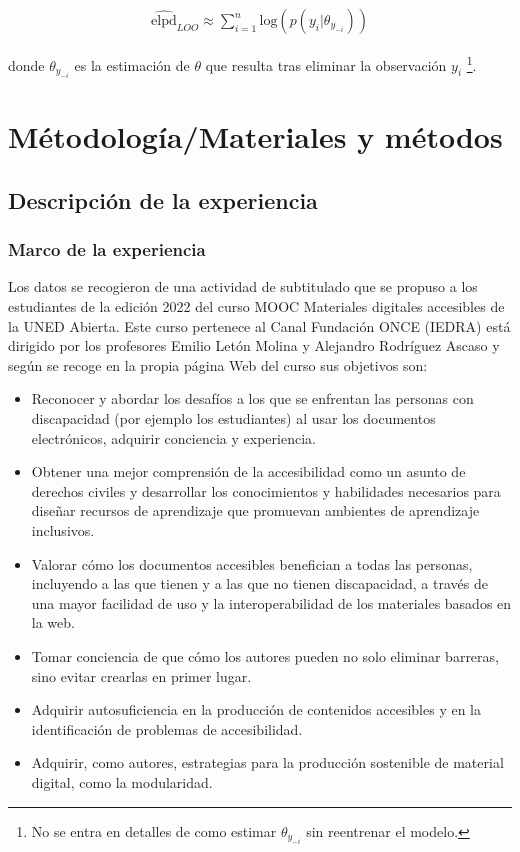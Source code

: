 \documentclass[
  12pt,
  a4paper,
  extrafontsizes,
  onecolumn,
  openright,
  table]{memoir}
\begin{document}
\[
\begin{aligned}
\widehat{\mathrm{elpd}}_{LOO} \approx \sum_{i=1}^{n} \mathrm{log} (p(y_{i} | \theta_{y_{-i}}))
\end{aligned}
\]

donde \(\theta_{y_{-i}}\) es la estimación de \(\theta\) que resulta
tras eliminar la observación \(y_{i}\) \footnote{No se entra en detalles
  de como estimar \(\theta_{y_{-i}}\) sin reentrenar el modelo.}.


\hypertarget{sec-metodo}{%
\chapter{Métodología/Materiales y métodos}\label{sec-metodo}}

\hypertarget{descripciuxf3n-de-la-experiencia}{%
\section{Descripción de la
experiencia}\label{descripciuxf3n-de-la-experiencia}}

\hypertarget{marco-de-la-experiencia}{%
\subsection{Marco de la experiencia}\label{marco-de-la-experiencia}}

Los datos se recogieron de una actividad de subtitulado que se propuso a
los estudiantes de la edición 2022 del curso MOOC Materiales digitales
accesibles de la UNED Abierta. Este curso pertenece al Canal Fundación
ONCE (IEDRA) está dirigido por los profesores Emilio Letón Molina y
Alejandro Rodríguez Ascaso y según se recoge en la propia página Web del
curso sus objetivos son:

\begin{itemize}
\item
  Reconocer y abordar los desafíos a los que se enfrentan las personas
  con discapacidad (por ejemplo los estudiantes) al usar los documentos
  electrónicos, adquirir conciencia y experiencia.
\item
  Obtener una mejor comprensión de la accesibilidad como un asunto de
  derechos civiles y desarrollar los conocimientos y habilidades
  necesarios para diseñar recursos de aprendizaje que promuevan
  ambientes de aprendizaje inclusivos.
\item
  Valorar cómo los documentos accesibles benefician a todas las
  personas, incluyendo a las que tienen y a las que no tienen
  discapacidad, a través de una mayor facilidad de uso y la
  interoperabilidad de los materiales basados en la web.
\item
  Tomar conciencia de que cómo los autores pueden no solo eliminar
  barreras, sino evitar crearlas en primer lugar.
\item
  Adquirir autosuficiencia en la producción de contenidos accesibles y
  en la identificación de problemas de accesibilidad.
\item
  Adquirir, como autores, estrategias para la producción sostenible de
  material digital, como la modularidad.
\end{itemize}
\end{document}
